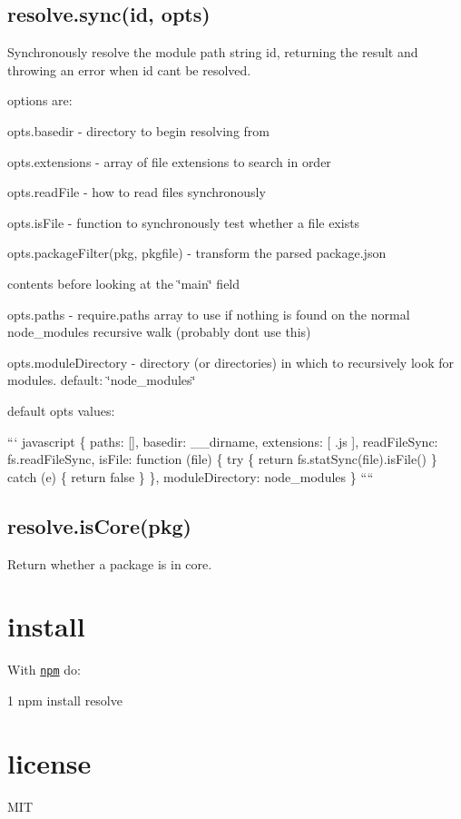 \subsection*{resolve.\+sync(id, opts)}

Synchronously resolve the module path string {\ttfamily id}, returning the result and throwing an error when {\ttfamily id} can\textquotesingle{}t be resolved.

options are\+:


\begin{DoxyItemize}
\item opts.\+basedir -\/ directory to begin resolving from
\item opts.\+extensions -\/ array of file extensions to search in order
\item opts.\+read\+File -\/ how to read files synchronously
\item opts.\+is\+File -\/ function to synchronously test whether a file exists
\item {\ttfamily opts.\+package\+Filter(pkg, pkgfile)} -\/ transform the parsed package.\+json
\item contents before looking at the \char`\"{}main\char`\"{} field
\item opts.\+paths -\/ require.\+paths array to use if nothing is found on the normal node\+\_\+modules recursive walk (probably don\textquotesingle{}t use this)
\item opts.\+module\+Directory -\/ directory (or directories) in which to recursively look for modules. default\+: {\ttfamily \char`\"{}node\+\_\+modules\char`\"{}}
\end{DoxyItemize}

default {\ttfamily opts} values\+:

``` javascript \{ paths\+: \mbox{[}\mbox{]}, basedir\+: \+\_\+\+\_\+dirname, extensions\+: \mbox{[} \textquotesingle{}.js\textquotesingle{} \mbox{]}, read\+File\+Sync\+: fs.\+read\+File\+Sync, is\+File\+: function (file) \{ try \{ return fs.\+stat\+Sync(file).is\+File() \} catch (e) \{ return false \} \}, module\+Directory\+: \textquotesingle{}node\+\_\+modules\textquotesingle{} \} ````

\subsection*{resolve.\+is\+Core(pkg)}

Return whether a package is in core.

\section*{install}

With \href{https://npmjs.org}{\tt npm} do\+:


\begin{DoxyCode}
1 npm install resolve
\end{DoxyCode}


\section*{license}

M\+I\+T 